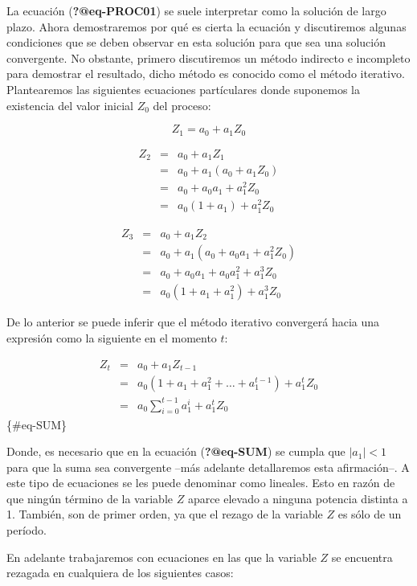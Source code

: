 \documentclass[
  a4paper,
]{article}
\begin{document}
La ecuación (\textbf{?@eq-PROC01}) se suele interpretar como la solución
de largo plazo. Ahora demostraremos por qué es cierta la ecuación y
discutiremos algunas condiciones que se deben observar en esta solución
para que sea una solución convergente. No obstante, primero discutiremos
un método indirecto e incompleto para demostrar el resultado, dicho
método es conocido como el método iterativo. Plantearemos las siguientes
ecuaciones partículares donde suponemos la existencia del valor inicial
\(Z_0\) del proceso:

\[
    Z_1 = a_0 + a_1 Z_0
\]

\begin{eqnarray*}
Z_2 & = & a_0 + a_1 Z_1 \\
    & = & a_0 + a_1 (a_0 + a_1 Z_0) \\
    & = & a_0 +  a_0 a_1 + a^2_1 Z_0 \\
    & = & a_0 (1 + a_1) + a^2_1 Z_0
\end{eqnarray*}

\begin{eqnarray*}
Z_3 & = & a_0 + a_1 Z_2 \\
    & = & a_0 + a_1 (a_0 +  a_0 a_1 + a^2_1 Z_0) \\
    & = & a_0 +  a_0 a_1 + a_0 a^2_1 + a^3_1 Z_0 \\
    & = & a_0 (1 + a_1 + a^2_1) + a^3_1 Z_0
\end{eqnarray*}

De lo anterior se puede inferir que el método iterativo convergerá hacia
una expresión como la siguiente en el momento \(t\):

\begin{eqnarray}
Z_t & = & a_0 + a_1 Z_{t-1} \nonumber \\
    & = & a_0 (1 + a_1 + a^2_1 + \ldots + a^{t-1}_1) + a^t_1 Z_0 \nonumber \\
    & = & a_0 \sum^{t-1}_{i = 0}{a^i_1} + a^t_1 Z_0
\end{eqnarray} \{\#eq-SUM\}

Donde, es necesario que en la ecuación (\textbf{?@eq-SUM}) se cumpla que
\(\lvert{a_1}\lvert < 1\) para que la suma sea convergente --más
adelante detallaremos esta afirmación--. A este tipo de ecuaciones se
les puede denominar como lineales. Esto en razón de que ningún término
de la variable \(Z\) aparce elevado a ninguna potencia distinta a 1.
También, son de primer orden, ya que el rezago de la variable \(Z\) es
sólo de un período.

En adelante trabajaremos con ecuaciones en las que la variable \(Z\) se
encuentra rezagada en cualquiera de los siguientes casos:
\end{document}
